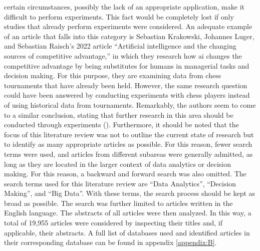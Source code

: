 certain circumstances, possibly the lack of an appropriate application, make it difficult to perform experiments. This fact would be completely lost if only studies that already perform experiments were considered. An adequate example of an article that falls into this category is Sebastian Krakowski, Johannes Luger, and Sebastian Raisch's 2022 article \enquote{Artificial intelligence and the changing sources of competitive advantage,} in which they research how \ac{ai} changes the competitive advantage by being substitutes for humans in managerial tasks and decision making. For this purpose, they are examining data from chess tournaments that have already been held. However, the same research question could have been answered by conducting experiments with chess players instead of using historical data from tournaments. Remarkably, the authors seem to come to a similar conclusion, stating that further research in this area should be conducted through experiments (\cite{Krakowski.2022}). Furthermore, it should be noted that the focus of this literature review was not to outline the current state of research but to identify as many appropriate articles as possible. For this reason, fewer search terms were used, and articles from different subareas were generally admitted, as long as they are located in the larger context of data analytics or decision making. For this reason, a backward and forward search was also omitted.
The search terms used for this literature review are \enquote{Data Analytics}, \enquote{Decision Making}, and \enquote{Big Data}. With these terms, the search process should be kept as broad as possible. The search was further limited to articles written in the English language. The abstracts of all articles were then analyzed. In this way, a total of 19,955 articles were considered by inspecting their titles and, if applicable, their abstracts. A full list of databases used and identified articles in their corresponding database can be found in appendix \ref{appendix:B}.

